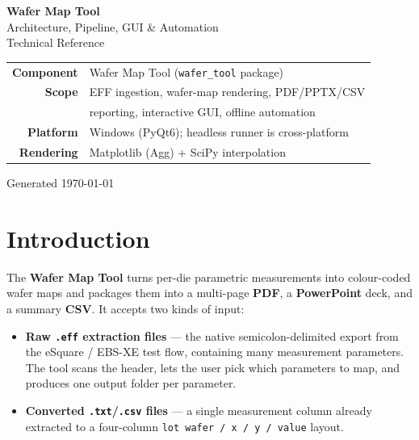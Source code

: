 \documentclass[11pt,a4paper]{report}
\newcommand{\code}[1]{\texttt{#1}}
\begin{document}
\begin{titlepage}
\centering
\vspace*{3cm}
{\Huge\bfseries\textcolor{accent}{Wafer Map Tool}}\\[6pt]
{\LARGE Architecture, Pipeline, GUI \& Automation}\\[4pt]
{\large Technical Reference}\\[2cm]
\begin{tabular}{rl}
\textbf{Component} & Wafer Map Tool (\code{wafer\_tool} package)\\[4pt]
\textbf{Scope} & EFF ingestion, wafer-map rendering, PDF/PPTX/CSV\\
 & reporting, interactive GUI, offline automation\\[4pt]
\textbf{Platform} & Windows (PyQt6); headless runner is cross-platform\\[4pt]
\textbf{Rendering} & Matplotlib (Agg) + SciPy interpolation\\
\end{tabular}
\vfill
{\large\textcolor{muted}{Generated \today}}
\end{titlepage}

\tableofcontents
\clearpage

\chapter{Introduction}

The \textbf{Wafer Map Tool} turns per-die parametric measurements into
colour-coded wafer maps and packages them into a multi-page \textbf{PDF},
a \textbf{PowerPoint} deck, and a summary \textbf{CSV}. It accepts two kinds of
input:

\begin{itemize}[leftmargin=1.4em]
  \item \textbf{Raw \code{.eff} extraction files} — the native semicolon-delimited
        export from the eSquare / EBS-XE test flow, containing many measurement
        parameters. The tool scans the header, lets the user pick which
        parameters to map, and produces one output folder per parameter.
  \item \textbf{Converted \code{.txt}/\code{.csv} files} — a single measurement
        column already extracted to a four-column
        \code{lot wafer\,/\,x\,/\,y\,/\,value} layout.
\end{itemize}
\end{document}
